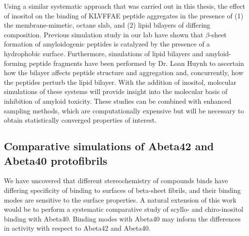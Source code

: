Using a similar systematic approach that was carried out in this thesis, the effect of inositol on the binding of KLVFFAE peptide aggregates in the presence of (1) the membrane-mimetic, octane slab, and (2) lipid bilayers of differing composition. Previous simulation study in our lab have shown that $\beta$-sheet formation of amyloidogenic peptides is catalyzed by the presence of a hydrophobic surface.\cite{Nikolic:2010go} Furthermore, simulations of lipid bilayers and amyloid-forming peptide fragments have been performed by Dr. Loan Huynh to ascertain how the bilayer affects peptide structure and aggregation and, concurrently, how the peptides perturb the lipid bilayer. With the addition of inositol, molecular simulations of these systems will provide insight into the  molecular basis of inhibition of amyloid toxicity. These studies can be combined with enhanced sampling methods,\cite{TVREX, STDR} which are computationally expensive but will be necessary to obtain statistically converged properties of interest.

\subsection{Comparative simulations of Abeta42 and Abeta40 protofibrils}
We have uncovered that different stereochemistry of compounds binds have differing specificity of binding to surfaces of beta-sheet fibrils, and their binding modes are sensitive to the surface properties.  
A natural extension of this work would be to perform a systematic comparative study of scyllo- and chiro-inositol binding with Abeta40.  Binding modes with Abeta40 may inform the differences in activity with respect to Abeta42 and Abeta40.




